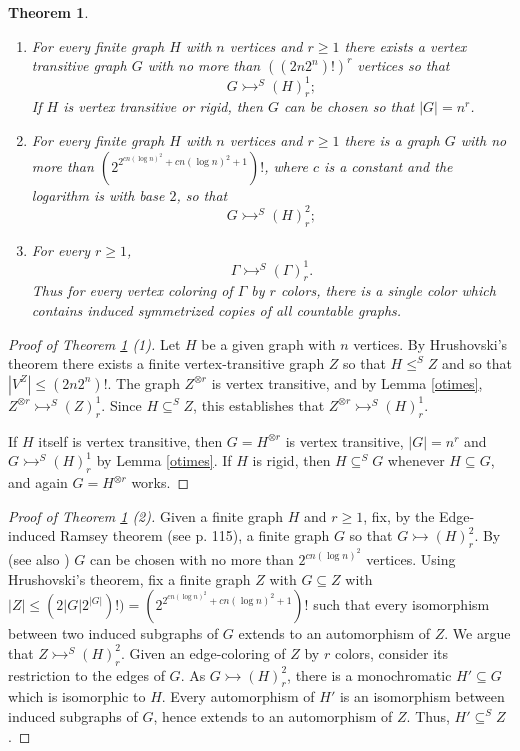 \documentclass[11pt]{amsart}
\newcommand{\ars}{\rightarrowtail}
\newcommand{\su}{\subseteq}
\newtheorem{theorem}{Theorem}[section]
\begin{document}
\begin{theorem}\label{main}
\begin{enumerate}
\item For every finite graph $H$ with $n$ vertices and $r\ge1$ there
  exists a  vertex transitive graph $G$ with no more than
  $((2n2^n)!)^r$ vertices so that
\[G\ars^S(H)^1_r;\]
If $H$ is vertex transitive or rigid, then $G$ can be chosen so that
$|G|=n^{r}$.

\item For every finite graph $H$ with $n$ vertices and $r\ge 1$ there
  is a graph $G$ with no more than $(2^{2^{cn(\log n)^2} + cn (\log
      n)^2 +1})!$, where $c$ is a constant and the logarithm is with
    base $2$,  so that
\[G\ars^S(H)^2_r;\]
\item For every $r\ge 1$,
\[\Gamma \ars^S(\Gamma)^1_r.\]
Thus for every vertex coloring of $\Gamma$ by $r$
  colors, there is a single color which contains induced symmetrized
  copies of all countable graphs. 

\end{enumerate}
\end{theorem}
 



\begin{proof}[Proof of Theorem \ref{main} (1)]
  Let $H$ be a given graph with $n$ vertices. By Hrushovski's theorem
 there exists a finite vertex-transitive graph $Z$ so that
  $H\le^S Z$ and so that $|V^Z|\le (2n2^n)!$. The graph $Z^{\otimes
    r}$ is vertex transitive, and by Lemma \ref{otimes}, $Z^{\otimes
    r}\ars^S(Z)^1_r$. Since $H\su^S Z$, this establishes that
  $Z^{\otimes r}\ars^S(H)^1_r$.

If $H$ itself is vertex transitive, then $G=H^{\otimes r}$ is vertex
transitive, $|G|=n^r$ and $G\ars^S(H)^1_r$ by Lemma \ref{otimes}. If
$H$ is rigid, then $H\su^S G$ whenever $H\su G$, and again
$G=H^{\otimes r}$ works. 
\end{proof}


\begin{proof}[Proof of Theorem \ref{main} (2)] 
  Given a finite graph $H$ and $r\ge 1$, fix, by the Edge-induced
  Ramsey theorem (see \cite{GRS} p. 115), a finite graph $G$ so that
  $G\ars (H)^2_r$. By \cite{KPR} (see also \cite{FS}) $G$ can be
  chosen with no more than $2^{cn (\log n)^2}$ vertices.  Using
  Hrushovski's theorem, fix a finite graph $Z$ with $G\su Z$ with
  $|Z|\le (2|G|2^{|G|})!)=(2^{2^{cn(\log n)^2} + cn (\log
      n)^2 +1})!$ such that every isomorphism between two induced
  subgraphs of $G$ extends to an automorphism of $Z$. We argue that
  $Z\ars^S(H)^2_r$.  Given an edge-coloring of $Z$ by $r$ colors,
  consider its restriction to the edges of $G$. As $G\ars (H)^2_r$,
  there is a monochromatic $H'\su G$ which is isomorphic to $H$.
  Every automorphism of $H'$ is an isomorphism between induced
  subgraphs of $G$, hence extends to an automorphism of $Z$. Thus,
  $H'\su^S Z$.
\end{proof}
\end{document}
